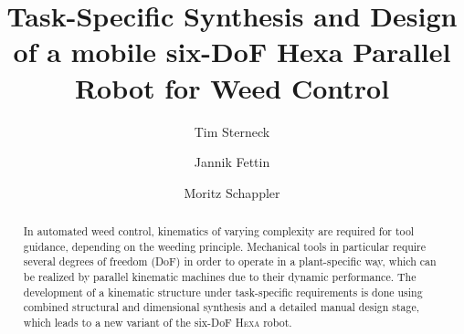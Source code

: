 \documentclass[runningheads,hidelinks]{llncs}
\begin{document}
%
\title{Task-Specific Synthesis and Design of a mobile six-DoF Hexa Parallel Robot for Weed Control}


\author{Tim Sterneck \and 
Jannik Fettin \and
Moritz Schappler }
%
%
\maketitle              %
%
\begin{abstract}
In automated weed control, kinematics of varying complexity are required for tool guidance, depending on the weeding principle. 
Mechanical tools in particular require several degrees of freedom (DoF) in order to operate in a plant-specific way, which can be realized by parallel kinematic machines due to their dynamic performance. 
The development of a kinematic structure under task-specific requirements is done using combined structural and dimensional synthesis and a detailed manual design stage, which leads to a new variant of the six-DoF \textsc{Hexa} robot. %
\end{abstract}
%
\end{document}
